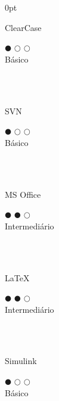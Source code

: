 \documentclass[a4paper]{article}
\begin{document}
\begin{adjustwidth}{\parindent}{0pt}
\begin{minipage}[t]{0.25\textwidth}
 \begin{minipage}{0.65\textwidth}
   \small{ClearCase}
 \end{minipage}
 \begin{minipage}{0.3\textwidth}
   \centering $\mdlgblkcircle$ $\mdlgwhtcircle$ $\mdlgwhtcircle$ \\  \footnotesize{Básico}
 \end{minipage} \\ \hspace{0pt} \\

 \begin{minipage}{0.65\textwidth}
   \small{SVN}
 \end{minipage}
 \begin{minipage}{0.3\textwidth}
   \centering $\mdlgblkcircle$ $\mdlgwhtcircle$ $\mdlgwhtcircle$ \\  \footnotesize{Básico}
 \end{minipage} \\ \hspace{0pt} \\
 
 \begin{minipage}{0.65\textwidth}
   \small{MS Office}
 \end{minipage}
 \begin{minipage}{0.3\textwidth}
   \centering $\mdlgblkcircle$ $\mdlgblkcircle$ $\mdlgwhtcircle$ \\  \footnotesize{\mbox{Intermediário}}
 \end{minipage} \\ \hspace{0pt} \\
 
 \begin{minipage}{0.65\textwidth}
   \small{\LaTeX}
 \end{minipage}
 \begin{minipage}{0.3\textwidth}
   \centering $\mdlgblkcircle$ $\mdlgblkcircle$ $\mdlgwhtcircle$ \\  \footnotesize{\mbox{Intermediário}}
 \end{minipage} \\ \hspace{0pt} \\
 
 \begin{minipage}{0.65\textwidth}
   \small{Simulink}
 \end{minipage}
 \begin{minipage}{0.3\textwidth}
   \centering $\mdlgblkcircle$ $\mdlgwhtcircle$ $\mdlgwhtcircle$ \\  \footnotesize{Básico}
 \end{minipage} \\ \hspace{0pt} \\
 

\end{minipage}
\end{adjustwidth}
\end{document}
